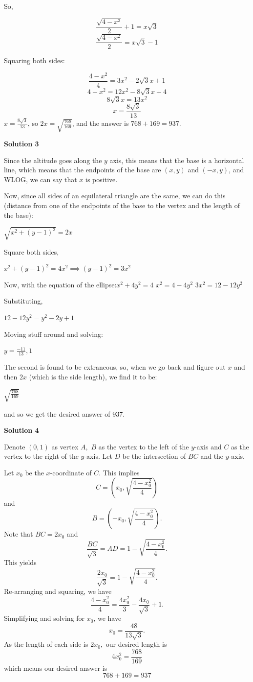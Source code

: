 \begin{enumerate}
 So,

 
 \[\frac {\sqrt{4-x^2}}{2}+1=x\sqrt{3}\]
 \[\frac {\sqrt{4-x^2}}{2}=x\sqrt{3}-1\]

 Squaring both sides:

 
 \[\frac {4-x^2}{4}=3x^2-2\sqrt{3}x+1\]
 \[4-x^2=12x^2-8\sqrt{3}x+4\]
 \[8\sqrt{3}x=13x^2\]
 \[x=\frac {8\sqrt{3}}{13}\]
$x=\frac {8\sqrt{3}}{13}$, so $2x=\sqrt{\frac{768}{169}}$, and the answer is $768+169=\boxed{937}$.

 



\textbf{Solution 3}

Since the altitude goes along the $y$ axis, this means that the base is a horizontal line, which means that the endpoints of the base are $(x,y)$ and $(-x,y)$, and WLOG, we can say that $x$ is positive.

 Now, since all sides of an equilateral triangle are the same, we can do this (distance from one of the endpoints of the base to the vertex and the length of the base):

 $\sqrt{x^2 + (y-1)^2} = 2x$

 Square both sides,

 $x^2 + (y-1)^2 = 4x^2\implies (y-1)^2 = 3x^2$

 Now, with the equation of the ellipse:$x^2 + 4y^2 = 4$
$x^2 = 4-4y^2$
$3x^2 = 12-12y^2$

 Substituting, 

 $12-12y^2 = y^2 - 2y +1$

 Moving stuff around and solving:

 $y = \frac{-11}{13}, 1$

 The second is found to be extraneous, so, when we go back and figure out $x$ and then $2x$  (which is the side length), we find it to be:

 $\sqrt{\frac{768}{169}}$ 

 and so we get the desired answer of $\boxed{937}$.

 



\textbf{Solution 4}

Denote $(0,1)$ as vertex $A,$ $B$ as the vertex to the left of the $y$-axis and $C$ as the vertex to the right of the $y$-axis. Let $D$ be the intersection of $BC$ and the $y$-axis.

 Let $x_0$ be the $x$-coordinate of $C.$ This implies
 \[C=\left(x_0 , \sqrt{\frac{4-x_0^2}{4}}\right)\]and 
 \[B=\left(-x_0 , \sqrt{\frac{4-x_0^2}{4}}\right).\]Note that $BC=2x_0$ and 
 \[\frac{BC}{\sqrt3}=AD=1-\sqrt{\frac{4-x_0^2}{4}}.\]This yields
 \[\frac{2x_0}{\sqrt3}=1-\sqrt{\frac{4-x_0^2}{4}}.\]Re-arranging and squaring, we have
 \[\frac{4-x_0^2}{4}=\frac{4x_0^2}{3}-\frac{4x_0}{\sqrt3} +1.\]Simplifying and solving for $x_0$, we have
 \[x_0=\frac{48}{13\sqrt 3}.\]As the length of each side is $2x_0,$ our desired length is
 \[4x_0^2=\frac{768}{169}\]which means our desired answer is
 \[768+169=\boxed{937}\]





\end{enumerate}
